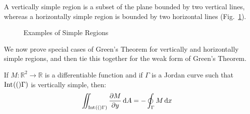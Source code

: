     A vertically simple region is a subset of the plane bounded by two
    vertical lines, whereas a horizontally simple region is
    bounded by two horizontal lines (Fig.~\ref{fig:Simply_Regions}).
    \begin{figure}[H]
        \centering
        \captionsetup{type=figure}
        \begin{subfigure}[b]{0.49\textwidth}
            \centering
            \captionsetup{type=figure}
            
        \end{subfigure}
        \hfill
        \begin{subfigure}[b]{0.49\textwidth}
            \centering
            \captionsetup{type=figure}
            
        \end{subfigure}
        \caption{Examples of Simple Regions}
        \label{fig:Simply_Regions}
    \end{figure}
    We now prove special cases of Green's Theorem for vertically and
    horizontally simple regions, and then tie this together for the weak
    form of Green's Theorem.
    \begin{theorem}
        \label{thm:Greens_Theorem_Simple_t1_region}%
        If $M:\mathbb{R}^{2}\rightarrow\mathbb{R}$ is
        a differentiable function and if $\Gamma$ is a Jordan curve such
        that $\interior[](\Gamma)$ is vertically simple, then:
        \begin{equation}
            \iint_{\interior[](\Gamma)}\frac{\partial{M}}{\partial{y}}\diff{A}
            =-\oint_{\Gamma}M\diff{x}
        \end{equation}
    \end{theorem}
